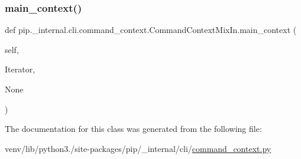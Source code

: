 \mbox{\label{classpip_1_1__internal_1_1cli_1_1command__context_1_1CommandContextMixIn_a71a6ab2ee5692a5c2122ebfb4e293b96}} 
\subsubsection{\texorpdfstring{main\+\_\+context()}{main\_context()}}
{\footnotesize\ttfamily def pip.\+\_\+internal.\+cli.\+command\+\_\+context.\+Command\+Context\+Mix\+In.\+main\+\_\+context (\begin{DoxyParamCaption}\item[{}]{self,  }\item[{}]{Iterator,  }\item[{}]{None }\end{DoxyParamCaption})}



The documentation for this class was generated from the following file\+:\begin{DoxyCompactItemize}
\item 
venv/lib/python3./site-\/packages/pip/\+\_\+internal/cli/\hyperlink{command__context_8py}{command\+\_\+context.\+py}\end{DoxyCompactItemize}
